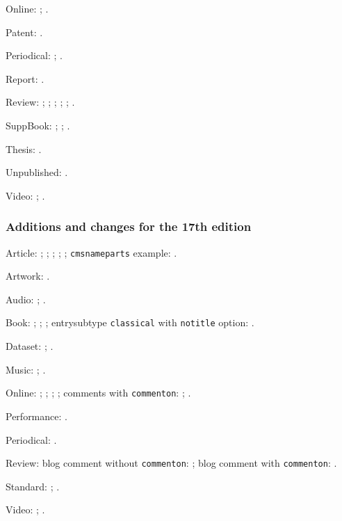 \documentclass[a4paper,12pt]{report}
\begin{document}
Online: \autocite{harwood:biden}; \autocite{powell:email}.

Patent: \autocite{petroff:impurity}.

Periodical: \autocite{good:wholeissue}; \autocite{whittington:water}.

Report: \autocite{herwign:office}.

Review: \autocite{ac:comment}; \autocite{bundy:macneil};
\autocite{Clemens:letter}; \autocite{kozinn:review};
\autocite{ratliff:review}; \autocite{wallraff:word}. 

SuppBook: \autocite{friedman:intro}; \autocite{polakow:afterw};
\autocite{prose:intro}.

Thesis: \autocite{murphy:silent}.

Unpublished: \autocite{nass:address}.

Video: \autocite{cleese:holygrail}; \autocite{hitchcock:nbynw}.

\subsubsection*{Additions and changes for the 17th edition}
\label{ed17}

Article: \autocite{amlen:hoot}; \autocite{black:infectious};
\autocite{kessler:nyt}; \autocite{saberhagen:beluga};
\autocite{stoffle:ghost}; \texttt{cmsnameparts} example:
\autocite{hua:cms}.

Artwork: \autocite{mccurry:afghangirl}.

Audio: \autocite{danforth:podcast}; \autocite{strayed:audiobook}.

Book: \autocite{angry:birds}; \autocite{gems:ipad};
\autocite{gems:print}; \textsf{entrysubtype} \texttt{classical} with
\texttt{notitle} option: \autocite[7.1.2]{herodotus:wilson}.

Dataset: \autocite{genbank:db}; \autocite{nasa:db}.

Music: \autocite{naraya}; \autocite{rihanna:umbrella}.

Online: \autocite{diaz:surprise}; \autocite{obrien:recycle};
\autocite{quora:thread}; \autocite{souza:obama}; comments with
\texttt{commenton}: \autocites{braun:reply}{quora:thread-customc};
\autocites{licis:diazcomment}{diaz:surprise-customc}.

Performance: \autocite{hamilton:miranda}.

Periodical: \autocite{amlen:wordplay}.

Review: blog comment without \texttt{commenton}: \autocite{viv:amlen};
blog comment with \texttt{commenton}:
\autocites{ac:comment}{ellis:blog-customc}.

Standard: \autocite{niso:bibref}; \autocite{w3c:xml}.

Video: \autocite{american:crime}; \autocite{mayberry:brady}.

\printbibliography[notkeyword=nosample,title=References]
\end{document}
